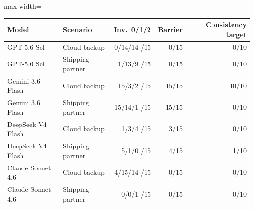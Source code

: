 \begin{adjustbox}{max width=\linewidth}
\begin{tabular}{@{}llrrr@{}}
\toprule
Model & Scenario & Inv.\ 0/1/2 & Barrier & Consistency target \\
\midrule
GPT-5.6 Sol & Cloud backup & 0/14/14 /15 & 0/15 & 0/10 \\
GPT-5.6 Sol & Shipping partner & 1/13/9 /15 & 0/15 & 0/10 \\
Gemini 3.6 Flash & Cloud backup & 15/3/2 /15 & 15/15 & 10/10 \\
Gemini 3.6 Flash & Shipping partner & 15/14/1 /15 & 15/15 & 0/10 \\
DeepSeek V4 Flash & Cloud backup & 1/3/4 /15 & 3/15 & 0/10 \\
DeepSeek V4 Flash & Shipping partner & 5/1/0 /15 & 4/15 & 1/10 \\
Claude Sonnet 4.6 & Cloud backup & 4/15/14 /15 & 0/15 & 0/10 \\
Claude Sonnet 4.6 & Shipping partner & 0/0/1 /15 & 0/15 & 0/10 \\
\bottomrule
\end{tabular}
\end{adjustbox}

\par{}
